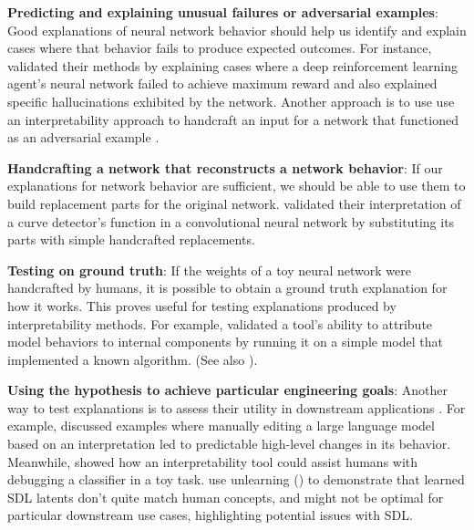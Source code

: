 \textbf{Predicting and explaining unusual failures or adversarial examples}: Good explanations of neural network behavior should help us identify and explain cases where that behavior fails to produce expected outcomes. For instance, \citet{hilton2020understanding} validated their methods by explaining cases where a deep reinforcement learning agent's neural network failed to achieve maximum reward and also explained specific hallucinations exhibited by the network. Another approach is to use use an interpretability approach to handcraft an input for a network that functioned as an adversarial example \citep{carter2019activation, casper2023diagnosticsdeepneuralnetworks, Mu_2020_Advances, hernandez2022natural}.

\textbf{Handcrafting a network that reconstructs a network behavior}: If our explanations for network behavior are sufficient, we should be able to use them to build replacement parts for the original network. \citet{cammarata2020curve} validated their interpretation of a curve detector's function in a convolutional neural network by substituting its parts with simple handcrafted replacements.

\textbf{Testing on ground truth}: If the weights of a toy neural network were handcrafted by humans, it is possible to obtain a ground truth explanation for how it works. This proves useful for testing explanations produced by interpretability methods. For example, \citet{conmy2023automatedcircuitdiscoverymechanistic} validated a tool's ability to attribute model behaviors to internal components by running it on a simple model that implemented a known algorithm. (See also ).

\textbf{Using the hypothesis to achieve particular engineering goals}: 
Another way to test explanations is to assess their utility in downstream applications \citep{doshivelez2017rigorousscienceinterpretablemachine, casper2023redteamingdeepneural}. For example, \citet{templeton2024scaling} discussed examples where manually editing a large language model based on an interpretation led to predictable high-level changes in its behavior. Meanwhile, \cite{marks2024sparsefeaturecircuitsdiscovering} showed how an interpretability tool could assist humans with debugging a classifier in a toy task. \citet{farrell2024applyingsparseautoencodersunlearn} use unlearning () to demonstrate that learned SDL latents don't quite match human concepts, and might not be optimal for particular downstream use cases, highlighting potential issues with SDL.

